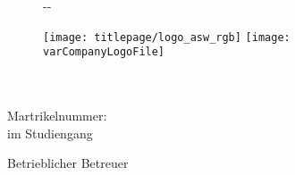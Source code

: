 \makeatletter
\begin{titlepage}
    \begin{figure}[t]
        \begin{adjustwidth}{-\oddsidemargin-1in}{-\rightmargin}
            
            \minipage{0pt}
              \noindent
            \endminipage
            
            \vspace*{10mm}
            \minipage{0.1\paperwidth}
              \hfill
            \endminipage
            \minipage{0.25\paperwidth}
              \texttt{[image: titlepage/logo\_asw\_rgb]}
            \endminipage
            \minipage{0.3\paperwidth}
                \hfill
            \endminipage
            \minipage{0.25\paperwidth}
                \ifdefined\varCompanyLogoFile
                  \texttt{[image: \\varCompanyLogoFile]}
                \else
                  \hfill
                \fi
            \endminipage

        \end{adjustwidth}
    \end{figure}

    \vspace*{2cm}

    \begin{flushleft}
        \Huge
        \textbf{\@title}\\[2cm]

        \LARGE
        {\@author}\\[0.5cm]

        \large
        Martrikelnummer: \varMartrikelnummer \\[0.5cm]

        \Large
        \varArbeit{} im Studiengang\\
        \varStudiengang
    \end{flushleft}

    \vspace{0.5cm}

    \begin{flushright}
        Betrieblicher Betreuer\\
        \varBetrBetreuer\\[0.5cm]


\end{flushright}
\end{titlepage}
